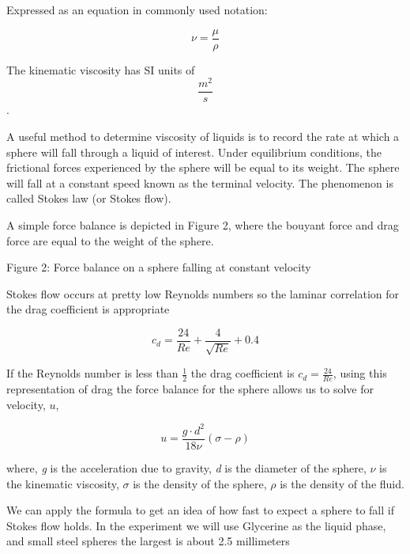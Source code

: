 \documentclass[11pt]{article}
\begin{document}
Expressed as an equation in commonly used notation:

\[ \nu = \frac{\mu}{\rho}\]

The kinematic viscosity has SI units of \[\frac{m^2}{s}\].

A useful method to determine viscosity of liquids is to record the rate
at which a sphere will fall through a liquid of interest. Under
equilibrium conditions, the frictional forces experienced by the sphere
will be equal to its weight. The sphere will fall at a constant speed
known as the terminal velocity. The phenomenon is called Stokes law (or
Stokes flow).

A simple force balance is depicted in Figure 2, where the bouyant force
and drag force are equal to the weight of the sphere.

Figure 2: Force balance on a sphere falling at constant velocity

Stokes flow occurs at pretty low Reynolds numbers so the laminar
correlation for the drag coefficient is appropriate

\[ c_d = \frac{24}{Re}+\frac{4}{\sqrt{Re}}+0.4 \]

If the Reynolds number is less than \(\frac{1}{2}\) the drag coefficient
is \(c_d = \frac{24}{Re}\), using this representation of drag the force
balance for the sphere allows us to solve for velocity, \(u\),

\[ u = \frac{g \cdot d^2}{18 \nu}(\sigma-\rho)\]

where, \emph{g} is the acceleration due to gravity, \emph{d} is the
diameter of the sphere, \(\nu\) is the kinematic viscosity, \(\sigma\)
is the density of the sphere, \(\rho\) is the density of the fluid.

We can apply the formula to get an idea of how fast to expect a sphere
to fall if Stokes flow holds. In the experiment we will use Glycerine as
the liquid phase, and small steel spheres the largest is about 2.5
millimeters
\end{document}
